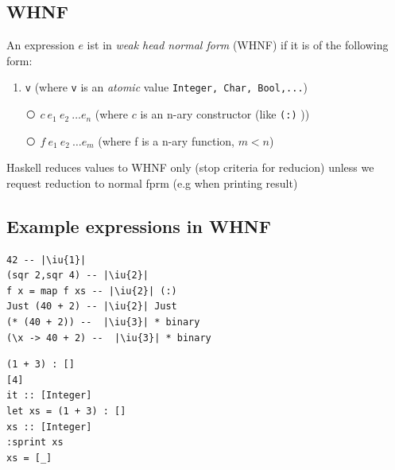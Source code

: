\documentclass{article}
\newcommand{\Haskell}[1]{\texttt{#1}}
\begin{document}
\subsection{WHNF}
An expression $e$ ist in \emph{weak head normal form} (WHNF) if it is of the following form:\\
\newcommand{\iu}[1]{\textcircled{\raisebox{-0.1em}{#1}}}
\begin{enumerate}[\iu{1}]
\item \Haskell{v} (where \Haskell{v} is an \emph{atomic} value \Haskell{Integer, Char, Bool,...})
\item[\iu{2}] $c\ e_1\ e_2\ \ldots e_n$ (where $c$ is an n-ary constructor (like \Haskell{(:)} ))
\item[\iu{3}] $f\ e_1\ e_2 \ \ldots e_m$ (where f is a n-ary function, $m < n$)
\end{enumerate}
Haskell reduces values to WHNF only (stop criteria for reducion) unless we request reduction to normal fprm (e.g when printing result)\\
\subsection{Example expressions in WHNF}
\begin{verbatim}
42 -- |\iu{1}|
(sqr 2,sqr 4) -- |\iu{2}|
f x = map f xs -- |\iu{2}| (:)
Just (40 + 2) -- |\iu{2}| Just
(* (40 + 2)) --  |\iu{3}| * binary
(\x -> 40 + 2) --  |\iu{3}| * binary
\end{verbatim}
\begin{verbatim}
(1 + 3) : []
[4]
it :: [Integer]
let xs = (1 + 3) : []
xs :: [Integer]
:sprint xs 
xs = [_]
\end{verbatim}
\end{document}
